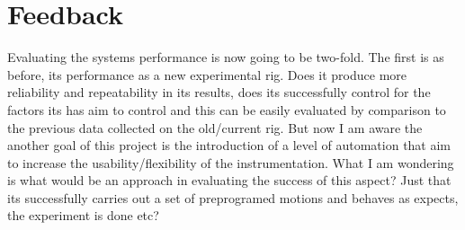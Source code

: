 \chapter*{Feedback}\label{C:feed} 

Evaluating the systems performance is now going to be two-fold. The first is as before, its performance as a new experimental rig. Does it produce more reliability and repeatability in its results, does its successfully control for the factors its has aim to control and this can be easily evaluated by comparison to the previous data collected on the old/current rig. But now I am aware the another goal of this project is the introduction of a level of automation that aim to increase the usability/flexibility of the instrumentation. What I am wondering is what would be an approach in evaluating the success of this aspect? Just that its successfully carries out a set of preprogramed motions and behaves as expects, the experiment is done etc?